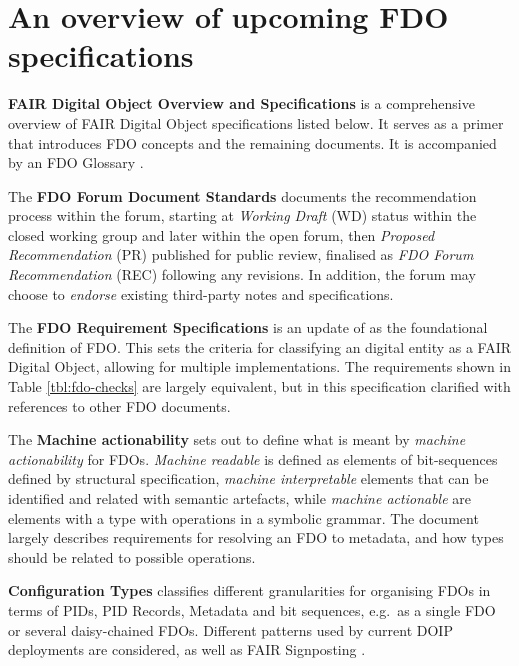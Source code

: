 \documentclass[fleqn,10pt,lineno]{wlpeerjlua}
\begin{document}
%
\def\UrlFont{\small}

\printbibliography
\clearpage

\appendix
\section{An overview of upcoming FDO specifications} \label{sec:appendixfdo}

\textbf{FAIR Digital Object Overview and Specifications} \autocite{fdo-Overview} is a comprehensive overview of FAIR Digital Object specifications listed below. It serves as a primer that introduces FDO concepts and the remaining documents. It is accompanied by an FDO Glossary \autocite{fdo-Glossary}.

The \textbf{FDO Forum Document Standards} \autocite{fdo-DocProcessStd} documents the recommendation process within the forum, starting at \emph{Working Draft} (WD) status within the closed working group and later within the open forum, then \emph{Proposed Recommendation} (PR) published for public review, finalised as \emph{FDO Forum Recommendation} (REC) following any revisions. In addition, the forum may choose to \emph{endorse} existing third-party notes and specifications.

The \textbf{FDO Requirement Specifications} \autocite{fdo-RequirementSpec} is an update of \autocite{boninoFAIRDigitalObject} as the foundational definition of FDO. This sets the criteria for classifying an digital entity as a FAIR Digital Object, allowing for multiple implementations. The requirements shown in Table \vref{tbl:fdo-checks} are largely equivalent, but in this specification clarified with references to other FDO documents.

The \textbf{Machine actionability} \autocite{fdo-MachineActionDef} sets out to define what is meant by \emph{machine actionability} for FDOs. \emph{Machine readable} is defined as elements of bit-sequences defined by structural specification, \emph{machine interpretable} elements that can be identified and related with semantic artefacts, while \emph{machine actionable} are elements with a type with operations in a symbolic grammar. The document largely describes requirements for resolving an FDO to metadata, and how types should be related to possible operations.

\textbf{Configuration Types} \autocite{fdo-ConfigurationTypes} classifies different granularities for organising FDOs in terms of PIDs, PID Records, Metadata and bit sequences, e.g.~as a single FDO or several daisy-chained FDOs. Different patterns used by current DOIP deployments are considered, as well as FAIR Signposting \autocite{vandesompel2015,vandesompelFAIRSignpostingProfile2022}.
\end{document}
